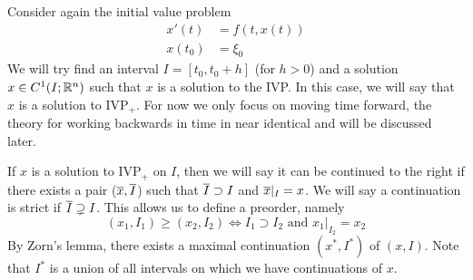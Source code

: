 Consider again the initial value problem 
\begin{align*}
    x'(t) &= f(t, x(t))\\
    x(t_0) &= \xi_0
\end{align*}
We will try find an interval $I = [t_0, t_0 + h]$ (for $h > 0$) and a solution $x \in C^1(I; \mathbb{R}^n)$ such that $x$ is a solution to the IVP. In this case, we will say that $x$ is a solution to IVP$_+$. For now we only focus on moving time forward, the theory for working backwards in time in near identical and will be discussed later. 

If $x$ is a solution to IVP$_+$ on $I$, then we will say it can be continued to the right if there exists a pair ($\overline{x}, \overline{I}$) such that $\overline{I} \supset I$ and $\overline{x}|_{I} = x$. We will say a continuation is strict if $\overline{I} \supsetneq I$. This allows us to define a preorder, namely
$$ (x_1, I_1) \geq (x_2, I_2) \Leftrightarrow I_1 \supset I_2 \text{ and } x_1|_{I_2} = x_2 $$
By Zorn's lemma, there exists a maximal continuation $(x^*, I^*)$ of $(x, I)$. Note that $I^*$ is a union of all intervals on which we have continuations of $x$.

